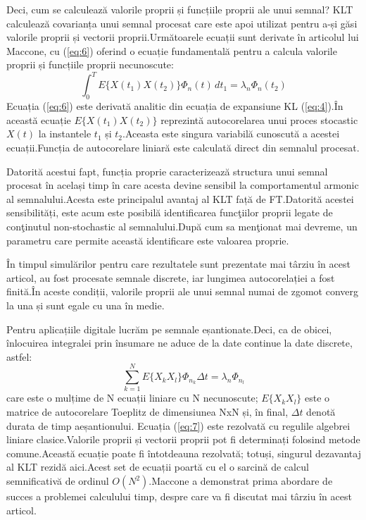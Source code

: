 \documentclass[12pt]{report}
\begin{document}
Deci, cum se calculează valorile proprii și funcțiile proprii ale unui semnal? KLT calculează covarianța unui semnal procesat care este apoi utilizat pentru a-și găsi valorile proprii și vectorii proprii.\@ Următoarele
ecuații sunt derivate în articolul lui Maccone, cu (\ref{eq:6}) oferind o ecuație fundamentală pentru a calcula valorile proprii și funcțiile proprii necunoscute:
\begin{equation}
	\int_{0}^{T}E\{X(t_1)X(t_2)\}\Phi_n(t)\,dt_1=\lambda_n\Phi_n(t_2)
	\label{eq:6}
\end{equation}
Ecuația (\ref{eq:6}) este derivată analitic din ecuația de expansiune KL (\ref{eq:4}).\@ În această ecuație $E\{X(t_1)X(t_2)\}$ reprezintă autocorelarea unui proces stocastic $X(t)$ la instantele $t_1$ și $t_2$.\@ Aceasta este singura variabilă cunoscută a acestei ecuații.\@ Funcția de autocorelare liniară este calculată direct din semnalul procesat.

Datorită acestui fapt, funcția proprie caracterizează structura unui semnal procesat în același timp în care acesta devine sensibil la comportamentul armonic al semnalului.\@ Acesta este principalul avantaj al KLT față de FT.\@ Datorită acestei sensibilități, este acum este posibilă identificarea funcţiilor proprii legate de conţinutul non-stochastic al semnalului.\@ După cum sa menţionat mai devreme, un parametru care permite această identificare este valoarea proprie.

În timpul simulărilor pentru care rezultatele sunt prezentate mai târziu în acest articol, au fost procesate semnale discrete, iar lungimea autocorelației a fost finită.\@ În aceste condiții, valorile proprii ale unui semnal numai de zgomot converg la una și sunt egale cu una în medie.

Pentru aplicațiile digitale lucrăm pe semnale eșantionate.\@ Deci, ca de obicei, înlocuirea integralei prin însumare ne aduce de la date continue la date discrete, astfel:
\begin{equation}
	\label{eq:7}
	\sum_{k=1}^{N}E\{X_kX_l\}{\Phi}_{n_k}{\Delta}t=\lambda_n \Phi_{n_l}
\end{equation}
care este o mulțime de N ecuații liniare cu N necunoscute; $E\{{X_k}{X_l}\}$ este o matrice de autocorelare Toeplitz de dimensiunea NxN și, în final, ${\Delta}t$ denotă durata de timp a\linebreak eșantionului.
Ecuația (\ref{eq:7}) este rezolvată cu regulile algebrei liniare clasice.\@ Valorile proprii și vectorii proprii pot fi determinați folosind metode comune.\@ Această ecuație poate fi întotdeauna rezolvată; totuși, singurul dezavantaj al KLT rezidă aici.\@ Acest set de ecuații poartă cu el o sarcină de calcul semnificativă de ordinul $O(N^2)$.\@ Maccone a demonstrat prima abordare de succes a problemei calculului timp, despre care va fi discutat mai târziu în acest articol.
\end{document}
